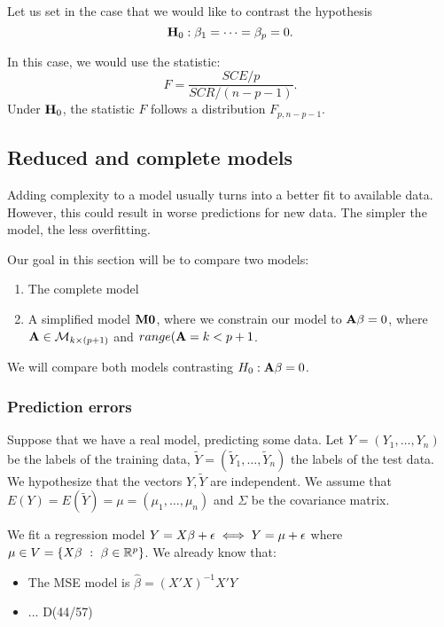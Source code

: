 Let us set in the case that we would like to contrast the hypothesis 
\[
\mathbf{H}_0: \beta_1 = \dots = \beta_p = 0 . 
\]

In this case, we would use the statistic:
\[
F = \frac{SCE/p}{SCR/(n-p-1)}.  
\]
Under \(\mathbf{H}_0\), the statistic \(F\) follows a distribution \(F_{p,n-p-1}\).


\subsection{Reduced and complete models}

Adding complexity to a model usually turns into a better fit to available data. However, this could result in worse predictions for new data. The simpler the model, the less overfitting.

Our goal in this section will be to compare two models:
\begin{enumerate}
\item The complete model
\item A simplified model \(\mathbf{M0}\), where we constrain our model to \(\mathbf{A}\mathbf{\beta} = 0\), where \(\mathbf{A} \in \mathcal M_{k \times (p+1)}\) and \(range(\mathbf{A} = k < p+1\).
\end{enumerate}

We will compare both models contrasting \(H_0 : \mathbf{A\beta} = 0\).

\subsubsection{Prediction errors}

Suppose that we have a real model, predicting some data. Let \(Y = (Y_{1},\dots,Y_{n})\) be the labels of the training data, \(\tilde Y = (\tilde Y_{1},\dots, \tilde Y_{n})\) the labels of the test data. We hypothesize that the vectors \(Y,\tilde Y\) are independent. We assume that \(E(Y) = E(\tilde Y) = \mu = (\mu_{1},\dots, \mu_{n})\) and \(\Sigma\) be the covariance matrix.

We fit a regression model \(Y = X \beta + \epsilon \;\Longleftrightarrow\; Y = \mu + \epsilon\) where \(\mu \in V = \{X\beta \ : \ \beta \in \mathbb{R}^{p}\}\). We already know that:

\begin{itemize}
  \item The MSE model is \(\hat \beta = (X'X)^{-1}X'Y\)
        \item ... D(44/57)
\end{itemize}


